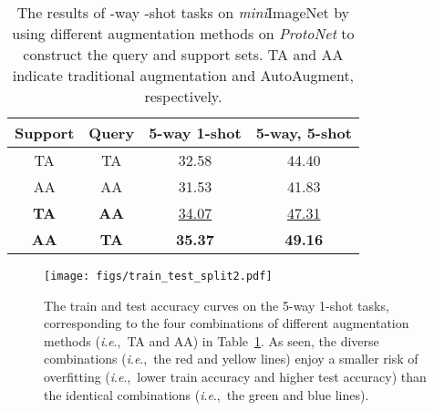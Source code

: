 \documentclass[letterpaper]{article} \usepackage{aaai21}  \usepackage{times}  \usepackage{helvet} \usepackage{courier}  \usepackage[hyphens]{url}  \usepackage{graphicx} \urlstyle{rm} \def\UrlFont{\rm}  \usepackage{natbib}  \usepackage{caption} \usepackage{url}
\newcommand{\ie}{\textit{i}.\textit{e}.,}
\begin{document}
\begin{table}[!tbp]\small
\normalsize
\vspace*{-1cm}
\begin{center}
\caption{The results of -way -shot tasks on \emph{mini}ImageNet by using different augmentation methods on \emph{ProtoNet} to construct the query and support sets. TA and AA indicate traditional augmentation and AutoAugment, respectively.}
\label{tab:compare_augmentation}
\begin{tabular}{cccc}
\toprule[1pt]
\textbf{Support} &  \textbf{Query} & \textbf{5-way 1-shot} & \textbf{5-way, 5-shot} \\  
\midrule
TA              & TA              & 32.58 & 44.40 \\ AA              & AA           & 31.53 & 41.83 \\ \textbf{TA}     & \textbf{AA}  & \underline{34.07} & \underline{47.31} \\ \textbf{AA}     & \textbf{TA}     & \textbf{35.37} & \textbf{49.16} \\ \bottomrule[1pt]
\end{tabular}
\end{center}
\vspace{-0.2cm}
\end{table}


\begin{figure}[tbp]
\begin{center}
\texttt{[image: figs/train\_test\_split2.pdf]}
\end{center}
\vspace{-0.3cm}
\caption{The train and test accuracy curves on the 5-way 1-shot tasks, corresponding to the four combinations of different augmentation methods (\ie~TA and AA) in Table~\ref{tab:compare_augmentation}. As seen, the diverse combinations (\ie~the red and yellow lines) enjoy a smaller risk of overfitting (\ie~lower train accuracy and higher test accuracy) than the identical combinations (\ie~the green and blue lines).}
\label{fig:train_test_curves}
\vspace{-0.3cm}
\end{figure}
\end{document}
